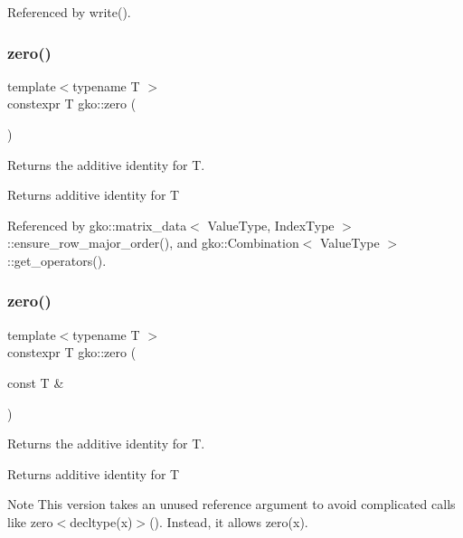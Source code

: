 Referenced by write().

\mbox{\label{namespacegko_a70dbe01ff95c7b953d3d737424c6feb5}} 
\subsubsection{\texorpdfstring{zero()}{zero()}\hspace{0.1cm}{\footnotesize\ttfamily [1/2]}}
{\footnotesize\ttfamily template$<$typename T $>$ \\
constexpr T gko\+::zero (\begin{DoxyParamCaption}{ }\end{DoxyParamCaption})\hspace{0.3cm}{\ttfamily [inline]}}



Returns the additive identity for T. 

\begin{DoxyReturn}{Returns}
additive identity for T 
\end{DoxyReturn}


Referenced by gko\+::matrix\+\_\+data$<$ Value\+Type, Index\+Type $>$\+::ensure\+\_\+row\+\_\+major\+\_\+order(), and gko\+::\+Combination$<$ Value\+Type $>$\+::get\+\_\+operators().

\mbox{\label{namespacegko_a9f1cd7be946b9a2c15b01b744cf3e732}} 
\subsubsection{\texorpdfstring{zero()}{zero()}\hspace{0.1cm}{\footnotesize\ttfamily [2/2]}}
{\footnotesize\ttfamily template$<$typename T $>$ \\
constexpr T gko\+::zero (\begin{DoxyParamCaption}\item[{const T \&}]{ }\end{DoxyParamCaption})\hspace{0.3cm}{\ttfamily [inline]}}



Returns the additive identity for T. 

\begin{DoxyReturn}{Returns}
additive identity for T
\end{DoxyReturn}
\begin{DoxyNote}{Note}
This version takes an unused reference argument to avoid complicated calls like {\ttfamily zero$<$decltype(x)$>$()}. Instead, it allows {\ttfamily zero(x)}. 
\end{DoxyNote}
